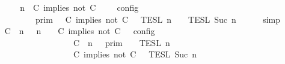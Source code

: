 \begin{isabellebody}
%
\isadelimproof
%
\endisadelimproof
%
\isatagproof
{}\isamarkupfalse%
\ {\isacharminus}\isanewline
\ \ \isamarkupfalse%
\ {\isacartoucheopen}{\isasymlbrakk}\ {\isasymGamma}{\isacharcomma}\ n\ {\isasymturnstile}\ {\isacharparenleft}C\ implies\ not\ C\ {\isacharhash}\ {\isasymPsi}\ {\isasymtriangleright}\ {\isasymPhi}\ {\isasymrbrakk}\isactrlsub c\isactrlsub o\isactrlsub n\isactrlsub f\isactrlsub i\isactrlsub g\isanewline
\ \ \ \ \ \ \ \ {\isacharequal}\ {\isasymlbrakk}{\isasymlbrakk}\ {\isasymGamma}\ {\isasymrbrakk}{\isasymrbrakk}\isactrlsub p\isactrlsub r\isactrlsub i\isactrlsub m\ {\isasyminter}\ {\isasymlbrakk}{\isasymlbrakk}\ {\isacharparenleft}C\ implies\ not\ C\ {\isacharhash}\ {\isasymPsi}\ {\isasymrbrakk}{\isasymrbrakk}\isactrlsub T\isactrlsub E\isactrlsub S\isactrlsub L\isactrlbsup {\isasymge}\ n\isactrlesup \ {\isasyminter}\ {\isasymlbrakk}{\isasymlbrakk}\ {\isasymPhi}\ {\isasymrbrakk}{\isasymrbrakk}\isactrlsub T\isactrlsub E\isactrlsub S\isactrlsub L\isactrlbsup {\isasymge}\ Suc\ n\isactrlesup {\isacartoucheclose}\isanewline
\ \ \ \ \isamarkupfalse%
\ simp\isanewline
\ \ \isamarkupfalse%
\ \isamarkupfalse%
\ {\isacartoucheopen}{\isasymlbrakk}\ {\isacharparenleft}{\isacharparenleft}C\ {\isasymnot}{\isasymUp}\ n{\isacharparenright}\ {\isacharhash}\ {\isasymGamma}{\isacharparenright}{\isacharcomma}\ n\ {\isasymturnstile}\ {\isasymPsi}\ {\isasymtriangleright}\ {\isacharparenleft}{\isacharparenleft}C\ implies\ not\ C\ {\isacharhash}\ {\isasymPhi}{\isacharparenright}\ {\isasymrbrakk}\isactrlsub c\isactrlsub o\isactrlsub n\isactrlsub f\isactrlsub i\isactrlsub g\isanewline
\ \ \ \ \ \ \ \ \ \ \ \ \ \ \ \ \ \ {\isacharequal}\ {\isasymlbrakk}{\isasymlbrakk}\ {\isacharparenleft}C\ {\isasymnot}{\isasymUp}\ n{\isacharparenright}\ {\isacharhash}\ {\isasymGamma}\ {\isasymrbrakk}{\isasymrbrakk}\isactrlsub p\isactrlsub r\isactrlsub i\isactrlsub m\ {\isasyminter}\ {\isasymlbrakk}{\isasymlbrakk}\ {\isasymPsi}\ {\isasymrbrakk}{\isasymrbrakk}\isactrlsub T\isactrlsub E\isactrlsub S\isactrlsub L\isactrlbsup {\isasymge}\ n\isactrlesup \isanewline
\ \ \ \ \ \ \ \ \ \ \ \ \ \ \ \ \ \ {\isasyminter}\ {\isasymlbrakk}{\isasymlbrakk}\ {\isacharparenleft}C\ implies\ not\ C\ {\isacharhash}\ {\isasymPhi}\ {\isasymrbrakk}{\isasymrbrakk}\isactrlsub T\isactrlsub E\isactrlsub S\isactrlsub L\isactrlbsup {\isasymge}\ Suc\ n\isactrlesup {\isacartoucheclose}\ \isamarkupfalse%

\end{isabellebody}
